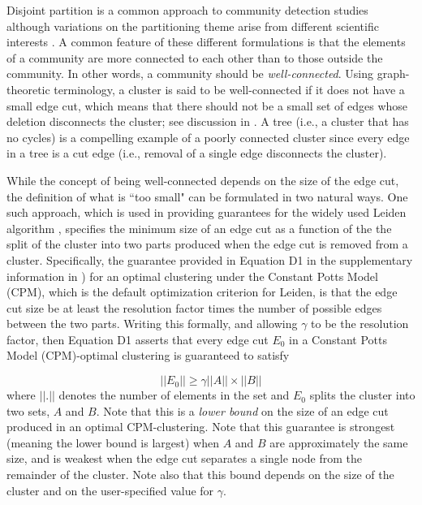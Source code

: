 \documentclass[11pt]{article}   	%
\begin{document}
Disjoint partition is a  common approach to community detection studies \citep{Fortunato2022,Fortunato2010} although variations on the partitioning theme arise from different scientific interests \citep{Coscia2011,Schaub2017}.
A common feature of these different formulations is that  the elements of a community are more connected to each other than to those outside the community. In other words, a community
should be {\em well-connected}. 
Using graph-theoretic terminology, a cluster is said to be well-connected if it does not have a small edge cut, which means that there should not be a small set of edges whose deletion
disconnects the cluster; see discussion in \cite{Traag_2019}. A tree  (i.e., a cluster that has no cycles) is  a compelling example of a poorly connected cluster since every edge in  a tree is a cut edge (i.e.,  removal of a single edge
disconnects the cluster). 

While the concept of being well-connected depends on the size of the edge cut, the definition of what is ``too small" can be formulated in two natural ways. One such  approach, which is used in 
providing guarantees for the widely used Leiden algorithm \citep{Traag_2019}, specifies the minimum size of an edge cut as a function of the the split  of the cluster into two parts produced
when the edge cut is removed from a cluster. Specifically, the guarantee provided   in Equation D1 in the supplementary information in \cite{Traag_2019}) for an optimal clustering under the Constant Potts Model (CPM), which is the default optimization criterion for Leiden, is that the edge cut size be at least the resolution factor   times the number of possible edges between the two  parts. Writing this formally, and allowing $\gamma$ to be the resolution factor, then Equation D1 asserts that every edge cut $E_0$ in a Constant Potts Model (CPM)-optimal clustering is guaranteed to satisfy

 \begin{equation}
 ||E_0|| \geq \gamma ||A|| \times ||B||
 \label{eqn:cpm-bound}
 \end{equation}
where $||.||$ denotes the number of elements in the set and $E_0$ splits the cluster into two sets, $A$ and $B$.
Note that this is a {\em lower bound} on the size of an edge cut produced in an optimal CPM-clustering.
Note  that this guarantee is strongest (meaning the lower bound is largest) when $A$ and $B$ are approximately the same size, and is weakest when the
edge cut separates a single node from the remainder of the cluster. Note also that this bound depends on the size of the cluster and on   the user-specified value for $\gamma$.
\end{document}
